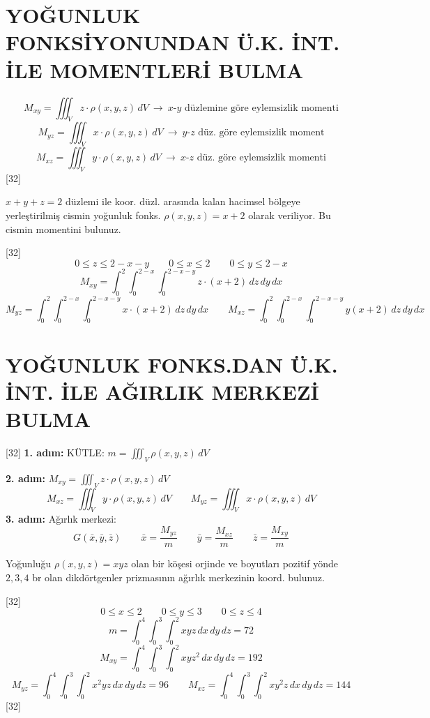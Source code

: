 \documentclass[11pt,a4paper]{article}
\begin{document}
\section{YOĞUNLUK FONKSİYONUNDAN Ü.K. İNT. İLE MOMENTLERİ BULMA}
\[ M_{xy}=\iiint_V z\cdot\rho(x,y,z)\,dV\ \longrightarrow\ x\text{-}y\text{ düzlemine göre eylemsizlik momenti} \]
\[ M_{yz}=\iiint_V x\cdot\rho(x,y,z)\,dV\ \longrightarrow\ y\text{-}z\text{ düz. göre eylemsizlik moment} \]
\[ M_{xz}=\iiint_V y\cdot\rho(x,y,z)\,dV\ \longrightarrow\ x\text{-}z\text{ düz. göre eylemsizlik momenti} \]
[32]

\begin{ornek}
$x+y+z=2$ düzlemi ile koor. düzl. arasında kalan hacimsel bölgeye yerleştirilmiş cismin yoğunluk fonks. $\rho(x,y,z)=x+2$ olarak veriliyor. Bu cismin momentini bulunuz.
\end{ornek}
[32]
\[ 0\le z\le2-x-y\qquad 0\le x\le2\qquad 0\le y\le2-x \]
\[ M_{xy}=\int_0^2\int_0^{2-x}\int_0^{2-x-y}z\cdot(x+2)\,dz\,dy\,dx \]
\[ M_{yz}=\int_0^2\int_0^{2-x}\int_0^{2-x-y}x\cdot(x+2)\,dz\,dy\,dx\qquad M_{xz}=\int_0^2\int_0^{2-x}\int_0^{2-x-y}y(x+2)\,dz\,dy\,dx \]

\section{YOĞUNLUK FONKS.DAN Ü.K. İNT. İLE AĞIRLIK MERKEZİ BULMA}
[32]
\noindent\textbf{1. adım:} KÜTLE: $\displaystyle m=\iiint_V\rho(x,y,z)\,dV$

\noindent\textbf{2. adım:} $\displaystyle M_{xy}=\iiint_V z\cdot\rho(x,y,z)\,dV$
\[ M_{xz}=\iiint_V y\cdot\rho(x,y,z)\,dV\qquad M_{yz}=\iiint_V x\cdot\rho(x,y,z)\,dV \]
\noindent\textbf{3. adım:} Ağırlık merkezi:
\[ G(\bar x,\bar y,\bar z)\qquad \bar x=\frac{M_{yz}}{m}\qquad \bar y=\frac{M_{xz}}{m}\qquad \bar z=\frac{M_{xy}}{m} \]
\begin{ornek}
Yoğunluğu $\rho(x,y,z)=xyz$ olan bir köşesi orjinde ve boyutları pozitif yönde $2,3,4$ br olan dikdörtgenler prizmasının ağırlık merkezinin koord. bulunuz.
\end{ornek}
[32]
\[ 0\le x\le2\qquad 0\le y\le3\qquad 0\le z\le4 \]
\[ m=\int_0^4\int_0^3\int_0^2xyz\,dx\,dy\,dz=72 \]
\[ M_{xy}=\int_0^4\int_0^3\int_0^2xyz^2\,dx\,dy\,dz=192 \]
\[ M_{yz}=\int_0^4\int_0^3\int_0^2x^2yz\,dx\,dy\,dz=96\qquad M_{xz}=\int_0^4\int_0^3\int_0^2xy^2z\,dx\,dy\,dz=144 \]
[32]
\end{document}
